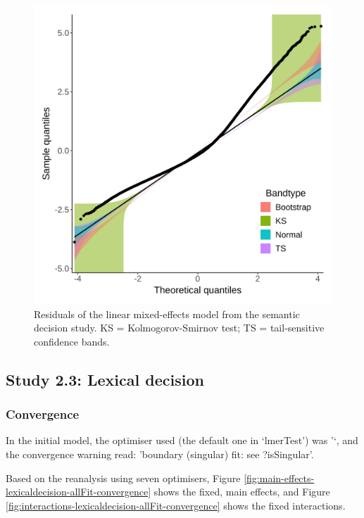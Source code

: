 \documentclass[
  12pt,
  man,floatsintext]{apa7}
\begin{document}
\begin{figure}

{\centering \includegraphics[width=0.65\linewidth]{../semanticdecision/frequentist_analysis/model_diagnostics/plots/semanticdecision_residuals} 

}

\caption{Residuals of the linear mixed-effects model from the semantic decision study. \linebreak KS = Kolmogorov-Smirnov test; TS = tail-sensitive confidence bands.}\label{fig:semanticdecision-residuals}
\end{figure}

\hypertarget{study-2.3-lexical-decision-1}{%
\subsection{Study 2.3: Lexical decision}\label{study-2.3-lexical-decision-1}}

\hypertarget{convergence-5}{%
\subsubsection{Convergence}\label{convergence-5}}

In the initial model, the optimiser used (the default one in `lmerTest') was '`, and the convergence warning read: 'boundary (singular) fit: see ?isSingular'.

Based on the reanalysis using seven optimisers, Figure \ref{fig:main-effects-lexicaldecision-allFit-convergence} shows the fixed, main effects, and Figure \ref{fig:interactions-lexicaldecision-allFit-convergence} shows the fixed interactions.
\end{document}
